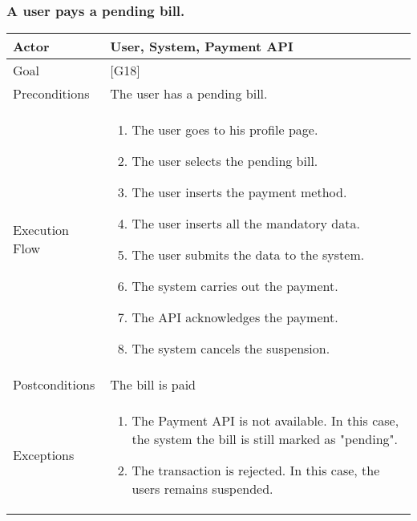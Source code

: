 \documentclass{article}
\begin{document}
  \subsubsection{A user pays a pending bill.}
  \begin{tabularx}{\textwidth}{  l  X  }
    \hline
    Actor & User, System, Payment API\\
    \hline
    Goal & [G18]\\
    \hline
    Preconditions & The user has a pending bill.\\
    \hline
    Execution Flow & \begin{enumerate}
      \item{The user goes to his profile page.}
                     \item{The user selects the pending bill.}
                     \item{The user inserts the payment method.}
                     \item{The user inserts all the mandatory data.}
                     \item{The user submits the data to the system.}
                     \item{The system carries out the payment.}
                     \item{The API acknowledges the payment.}
                     \item{The system cancels the suspension.}
                    \end{enumerate}\\
    \hline
    Postconditions & The bill is paid\\
    \hline
    Exceptions & \begin{enumerate}
        \item{The Payment API is not available. In this case, the system the bill is still marked as "pending".}
        \item{The transaction is rejected. In this case, the users remains suspended.}
  \end{enumerate}\\
    \hline
  \end{tabularx}
\end{document}
